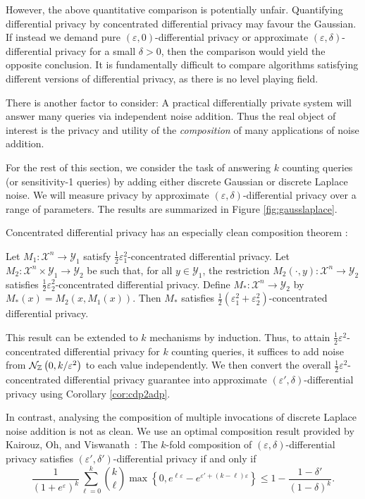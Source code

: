 \documentclass{jpcfinal} %
\newcommand{\dgausss}[2]{{\discN\left(#1,#2\right)}}
\newcommand{\dgauss}[1]{\dgausss{0}{#1}}
\begin{document}
However, the above quantitative comparison is potentially unfair. Quantifying differential privacy by concentrated differential privacy may favour the Gaussian. If instead we demand pure $(\varepsilon,0)$-differential privacy or approximate $(\varepsilon,\delta)$-differential privacy for a small $\delta>0$, then the comparison would yield the opposite conclusion. It is fundamentally difficult to compare algorithms satisfying different versions of differential privacy, as there is no level playing field.

There is another factor to consider: A practical differentially private system will answer many queries via independent noise addition. Thus the real object of interest is the privacy and utility of the \emph{composition} of many applications of noise addition.

For the rest of this section, we consider the task of answering $k$ counting queries (or sensitivity-1 queries) by adding either discrete Gaussian or discrete Laplace noise. We will measure privacy by approximate $(\varepsilon,\delta)$-differential privacy over a range of parameters. The results are summarized in Figure \ref{fig:gausslaplace}.

Concentrated differential privacy has an especially clean composition theorem \citep{BunS16}:
\begin{lem}
Let $M_1\colon \mathcal{X}^n \to \mathcal{Y}_1$ satisfy $\frac12\varepsilon_1^2$-concentrated differential privacy. Let $M_2\colon \mathcal{X}^n \times \mathcal{Y}_1 \to \mathcal{Y}_2$ be such that, for all $y \in \mathcal{Y}_1$, the restriction $M_2(\cdot,y)\colon \mathcal{X}^n \to \mathcal{Y}_2$ satisfies $\frac12\varepsilon_2^2$-concentrated differential privacy. Define $M_*\colon \mathcal{X}^n \to \mathcal{Y}_2$ by $M_*(x) = M_2(x,M_1(x))$. Then $M_*$ satisfies $\frac12(\varepsilon_1^2+\varepsilon_2^2)$-concentrated differential privacy.
\end{lem}
This result can be extended to $k$ mechanisms by induction. 
Thus, to attain $\frac12\varepsilon^2$-concentrated differential privacy for $k$ counting queries, it suffices to add noise from $\dgauss{k/\varepsilon^2}$ to each value independently. We then convert the overall $\frac12\varepsilon^2$-concentrated differential privacy guarantee into approximate $(\varepsilon',\delta)$-differential privacy using Corollary \ref{cor:cdp2adp}.

In contrast, analysing the composition of multiple invocations of discrete Laplace noise addition is not as clean. We use an optimal composition result provided by Kairouz, Oh, and Viswanath~\citep{KairouzOV17,MurtaghV16}:
The $k$-fold composition of $(\varepsilon,\delta)$-differential privacy satisfies $(\varepsilon',\delta')$-differential privacy if and only if
\begin{equation}
    \frac{1}{(1+e^\varepsilon)^k}\sum_{\ell=0}^k {k \choose \ell} \max\left\{ 0 , e^{\ell\varepsilon} - e^{\varepsilon' + (k-\ell)\varepsilon} \right\} \le 1 - \frac{1-\delta'}{(1-\delta)^k}.
\end{equation}
\end{document}
